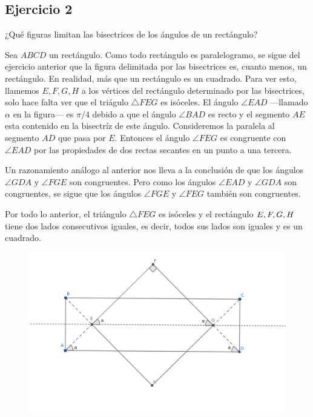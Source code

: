 \subsection*{Ejercicio 2}
¿Qué figuras limitan las bisectrices de los ángulos de un rectángulo?
\begin{sol}
	Sea $ABCD$ un rectángulo. Como todo rectángulo es paralelogramo, se sigue del ejercicio anterior que la figura delimitada por las bisectrices es, cuanto menos, un rectángulo. En realidad, más que un rectángulo es un cuadrado. Para ver esto, llamemos $E,F,G,H$ a los vértices del rectángulo determinado por las bisectrices, solo hace falta ver que el triágulo $\triangle FEG$ es isóceles. El ángulo $\angle EAD$ ---llamado $\alpha$ en la figura--- es $\pi/4$ debido a que el ángulo $\angle BAD$ es recto y el segmento $AE$ esta contenido en la bisectríz de este ángulo. Consideremos la paralela al segmento $AD$ que pasa por $E$. Entonces el ángulo $\angle FEG$ es congruente con $\angle EAD$ por las propiedades de dos rectas secantes en un punto a una tercera. 
	
	Un razonamiento análogo al anterior nos lleva a la conclusión de que los ángulos $\angle GDA$ y $\angle FGE$ son congruentes. Pero como los ángulos $\angle EAD$ y $\angle GDA$ son congruentes, se sigue que los ángulos $\angle FGE$ y $\angle FEG$ también son congruentes.
	
	Por todo lo anterior, el triángulo $\triangle FEG$ es isóceles y el rectángulo $E,F,\linebreak G,H$ tiene dos lados consecutivos iguales, es decir, todos sus lados son iguales y es un cuadrado.
		\begin{figure}[H]\centering
		\includegraphics[width=1\linewidth]{pics/g2}
	\end{figure}
\end{sol}
